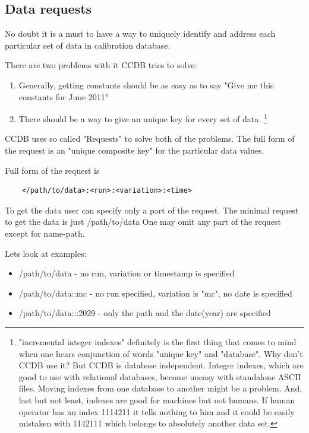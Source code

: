 \documentclass{article}
\begin{document}
%
\subsection{Data requests}
No doubt it is a must to have a way to uniquely identify and address each 
particular set of data in calibration database.
 
There are two problems with it CCDB tries to solve:
\begin{enumerate}
  \item Generally, getting constants should be as easy as to say
        "Give me this constants for June 2011"

  \item There should be a way to give an unique key for every set of data.
  \footnote{
    "incremental integer indexes" definitely is the first thing that comes to mind 
    when one hears conjunction of words "unique key" and "database". Why don't CCDB use it?
    But CCDB is database independent. Integer indexes, which are good to use with
    relational databases, become uneasy with standalone ASCII
    files. Moving indexes from one database to another might be a
    problem. And, last but not least, indexes are good for machines but not humans. If 
    human operator has an index 1114211 it tells nothing to him and it could be easily
    mistaken with 1142111 which belongs to absolutely another data set.
  }
\end{enumerate}
\vspace{1 em}

CCDB uses so called "Requests" to solve both of the problems.
The full form of  the request is an "unique composite key" for
the particular data values.

Full form of the request is
\begin{verbatim}
    </path/to/data>:<run>:<variation>:<time>
\end{verbatim}
\vspace{1 em}

To get the data user can specify only a part of the request.
The minimal request to get the data is just /path/to/data
One may omit any part of the request except for name-path.

Lets look at examples:
\begin{itemize}
\item /path/to/data - no run, variation or timestamp is specified
\item /path/to/data::mc - no run specified, variation is "mc", no date is specified
\item /path/to/data:::2029 - only the path and the date(year) are specified
\end{itemize}
\end{document}
